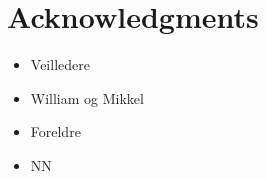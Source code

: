 \chapter*{Acknowledgments}
\begin{itemize}
\item Veilledere
\item William og Mikkel
\item Foreldre
\item NN 

\end{itemize}